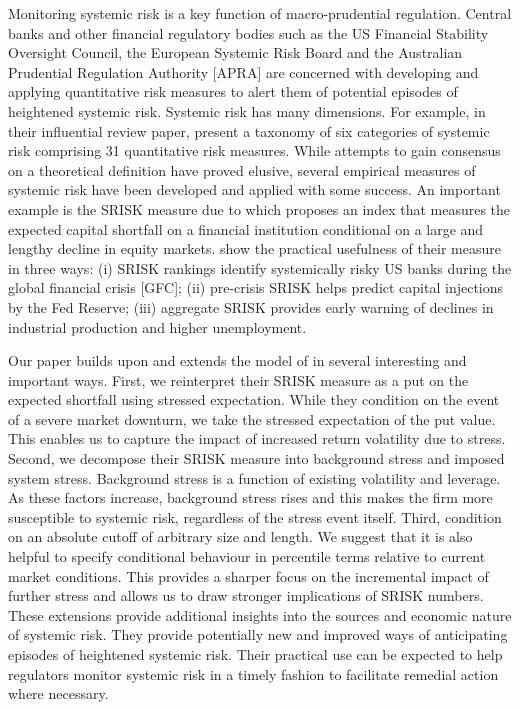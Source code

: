 \documentclass[authoryear]{elsarticle}
\begin{document}
Monitoring systemic risk is a key function of macro-prudential regulation. Central banks and other financial regulatory bodies such as the US Financial Stability Oversight Council, the European Systemic Risk Board and the Australian Prudential Regulation Authority [APRA] are concerned with developing and applying quantitative risk measures to alert them of potential episodes of heightened systemic risk. Systemic risk has many dimensions. For example, in their influential review paper, \cite{Bisias2012} present a taxonomy of six categories of systemic risk comprising 31 quantitative risk measures. While attempts to gain consensus on a theoretical definition have proved elusive, several empirical measures of systemic risk have been developed and applied with some success.  An important example is the SRISK measure due to \cite{brownlees2015} which proposes an index that measures the expected capital shortfall on a financial institution conditional on a large and lengthy decline in equity markets. \cite{brownlees2015} show the practical usefulness of their measure in three ways: (i) SRISK rankings identify systemically risky US banks during the global financial crisis [GFC]; (ii) pre-crisis SRISK helps predict capital injections by the Fed Reserve; (iii) aggregate SRISK provides early warning of declines in industrial production and higher unemployment.

Our paper builds upon and extends the model of \cite{brownlees2015} in several interesting and important ways. First, we reinterpret their SRISK measure as a put on the expected shortfall using stressed expectation. While they condition on the event of a severe market downturn, we take the stressed expectation of the put value. This enables us to capture the impact of increased return volatility due to stress. Second, we decompose their SRISK measure into background stress and imposed system stress. Background stress is a function of existing volatility and leverage. As these factors increase, background stress rises and this makes the firm more susceptible to systemic risk, regardless of the stress event itself. Third,    
\cite{brownlees2015} condition on an absolute cutoff of arbitrary size and length. We suggest that it is also helpful to specify conditional behaviour in percentile terms relative to current market conditions. This provides a sharper focus on the incremental impact of further stress and allows us to draw stronger implications of SRISK numbers. These extensions provide additional insights into the sources and economic nature of systemic risk. They provide potentially new and improved ways of anticipating episodes of heightened systemic risk. Their practical use can be expected to help regulators monitor systemic risk in a timely fashion to facilitate remedial action where necessary.
\end{document}
